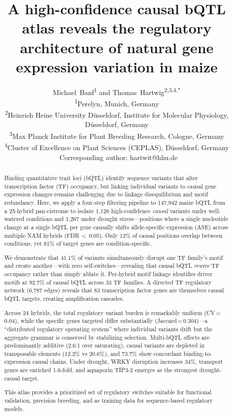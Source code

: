 \documentclass[11pt,a4paper]{article}
\title{\textbf{A high-confidence causal bQTL atlas reveals the regulatory
architecture of natural gene expression variation in maize}}
\author{
Michael~Banf\textsuperscript{1} and Thomas~Hartwig\textsuperscript{2,3,4,*}
\\[6pt]
\small\textsuperscript{1}Perelyn, Munich, Germany\\
\small\textsuperscript{2}Heinrich Heine University D\"usseldorf, Institute for Molecular Physiology, D\"usseldorf, Germany\\
\small\textsuperscript{3}Max Planck Institute for Plant Breeding Research, Cologne, Germany\\
\small\textsuperscript{4}Cluster of Excellence on Plant Sciences (CEPLAS), D\"usseldorf, Germany\\[4pt]
\small *~Corresponding author: hartwit@hhu.de
}
\date{}
\begin{document}
\maketitle

\begin{abstract}

Binding quantitative trait loci (bQTL) identify sequence variants that alter
transcription factor (TF) occupancy, but linking individual variants to causal
gene expression changes remains challenging due to linkage disequilibrium and
motif redundancy. Here, we apply a four-step filtering pipeline to 147,942
maize bQTL from a 25-hybrid pan-cistrome to isolate 1,126 high-confidence
\emph{causal} variants under well-watered conditions and 1,267 under
drought stress---positions where a single nucleotide change at a single bQTL
per gene causally shifts allele-specific expression (ASE) across multiple NAM
hybrids (FDR\,$<$\,0.05). Only 12\% of causal positions overlap between
conditions, yet 81\% of target genes are condition-specific.

We demonstrate that 41.1\% of variants simultaneously disrupt one TF
family's motif and create another---with zero self-switches---revealing that
causal bQTL \emph{rewire} TF occupancy rather than simply ablate it. Per-hybrid
motif linkage identifies driver motifs at 92.7\% of causal bQTL across 33 TF
families. A directed TF regulatory network (6,787 edges) reveals that 83
transcription factor genes are themselves causal bQTL targets, creating
amplification cascades.

Across 24 hybrids, the total regulatory variant burden is remarkably uniform
(CV\,=\,0.04), while the specific genes targeted differ substantially
(Jaccard\,=\,0.304)---a ``distributed regulatory operating system'' where
individual variants drift but the aggregate grammar is conserved by
stabilizing selection. Multi-bQTL effects are predominantly additive
(2.6:1 over saturating), causal variants are depleted in transposable
elements (12.2\% vs 20.6\%), and 73.7\% show concordant
binding-to-expression causal chains. Under drought, WRKY disruption
increases 34\%, transport genes are enriched 1.6-fold, and aquaporin TIP3-2
emerges as the strongest drought-causal target.

This atlas provides a prioritized set of regulatory switches suitable for
functional validation, precision breeding, and as training data for
sequence-based regulatory models.

\end{abstract}
\end{document}
